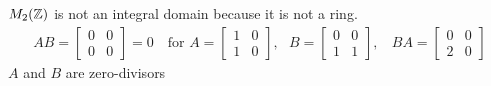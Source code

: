 \begin{example}
$M_2({\mathbb{ Z}})$ is not an integral domain because it is not a  ring.
\begin{align}
    AB= \begin{bmatrix}
            0&0\\0&0
    \end{bmatrix} = 0 \ \ \ \text{ for } A= \begin{bmatrix}
            1&0\\1&0
    \end{bmatrix}, \ \ \ B= \begin{bmatrix}
            0&0\\1&1
    \end{bmatrix}, \ \ \ \ BA = \begin{bmatrix}
            0&0\\2&0
    \end{bmatrix} \nonumber
\end{align}
$A$ and $B$ are zero-divisors
\end{example}
\newpage

